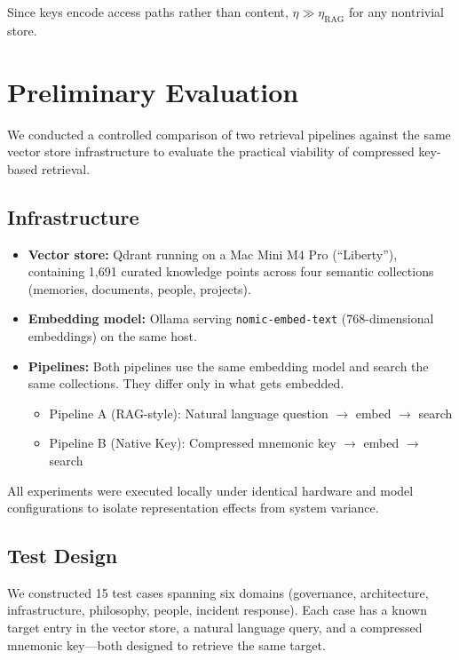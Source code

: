 \documentclass{article}
\begin{document}
Since keys encode access paths rather than content, $\eta \gg \eta_{\text{RAG}}$ for any nontrivial store.

\section{Preliminary Evaluation}
\label{sec:evaluation}

We conducted a controlled comparison of two retrieval pipelines against the same vector store infrastructure to evaluate the practical viability of compressed key-based retrieval.

\subsection{Infrastructure}

\begin{itemize}
\item \textbf{Vector store:} Qdrant running on a Mac Mini M4 Pro (``Liberty''), containing 1,691 curated knowledge points across four semantic collections (memories, documents, people, projects).
\item \textbf{Embedding model:} Ollama serving \texttt{nomic-embed-text} (768-dimensional embeddings) on the same host.
\item \textbf{Pipelines:} Both pipelines use the same embedding model and search the same collections. They differ only in what gets embedded.
  \begin{itemize}
  \item Pipeline A (RAG-style): Natural language question $\rightarrow$ embed $\rightarrow$ search
  \item Pipeline B (Native Key): Compressed mnemonic key $\rightarrow$ embed $\rightarrow$ search
  \end{itemize}
\end{itemize}

All experiments were executed locally under identical hardware and model configurations to isolate representation effects from system variance.

\subsection{Test Design}

We constructed 15 test cases spanning six domains (governance, architecture, infrastructure, philosophy, people, incident response). Each case has a known target entry in the vector store, a natural language query, and a compressed mnemonic key---both designed to retrieve the same target.
\end{document}
